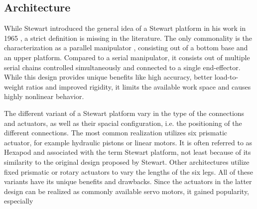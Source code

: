 \subsection{Architecture}
While Stewart introduced the general idea of a Stewart platform in his work in
1965 \citep{Ste65}, a strict definition is missing in the literature. The only
commonality is the characterization as a parallel manipulator \citep{Szu13},
consisting out of a bottom base and an upper platform. Compared to a serial
manipulator, it consists out of multiple serial chains controlled
simultaneously and connected to a single end-effector. While this design
provides unique benefits like high accuracy, better load-to-weight ratios and
improved rigidity, it limits the available work space and causes highly
nonlinear behavior.

The different variant of a Stewart platform vary in the type of the
connections and actuators, as well as their spacial configuration, i.e. the
positioning of the different connections. The most common realization utilizes
six prismatic actuator, for example hydraulic pistons or linear motors. It is
often referred to as Hexapod and associated with the term Stewart platform,
not least because of its similarity to the original design proposed by
Stewart. Other architectures utilize fixed prismatic or rotary actuators to
vary the lengths of the six legs. All of these variants have its unique
benefits and drawbacks. Since the actuators in the latter design can be
realized as commonly available servo motors, it gained popularity, especially
